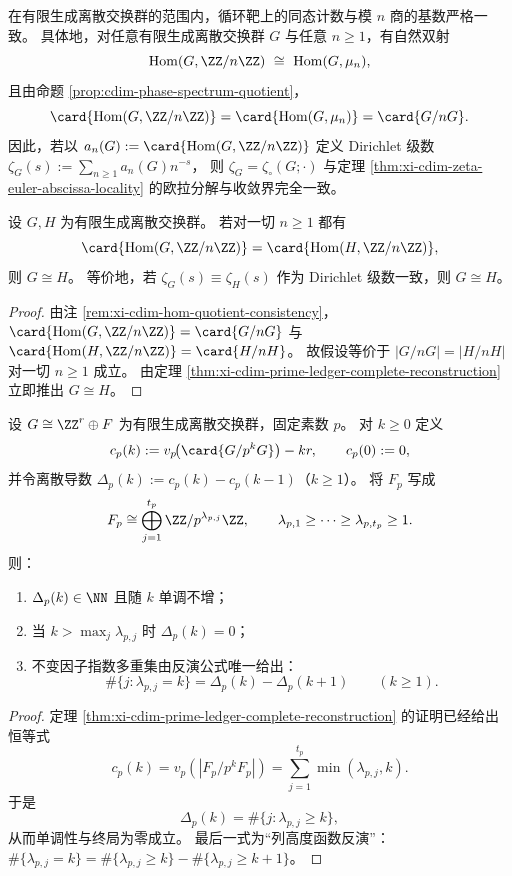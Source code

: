 \begin{remark}\label{rem:xi-cdim-hom-quotient-consistency}
在有限生成离散交换群的范围内，循环靶上的同态计数与模 \(n\) 商的基数严格一致。
具体地，对任意有限生成离散交换群 \(G\) 与任意 \(n\ge 1\)，有自然双射
\[
\operatorname{Hom}(G,\ZZ/n\ZZ)\ \cong\ \operatorname{Hom}(G,\mu_n),
\]
且由命题 \ref{prop:cdim-phase-spectrum-quotient}，
\[
\card{\operatorname{Hom}(G,\ZZ/n\ZZ)}=\card{\operatorname{Hom}(G,\mu_n)}=\card{G/nG}.
\]
因此，若以
\(
a_n(G):=\card{\operatorname{Hom}(G,\ZZ/n\ZZ)}
\)
定义 Dirichlet 级数
\(
\zeta_G(s):=\sum_{n\ge 1}a_n(G)n^{-s}
\)，
则 \(\zeta_G=\zeta_{\circ}(G;\cdot)\) 与定理 \ref{thm:xi-cdim-zeta-euler-abscissa-locality} 的欧拉分解与收敛界完全一致。
\end{remark}

\begin{corollary}\label{cor:xi-cdim-zeta-fingerprint-rigidity}
设 \(G,H\) 为有限生成离散交换群。
若对一切 \(n\ge 1\) 都有
\[
\card{\operatorname{Hom}(G,\ZZ/n\ZZ)}=\card{\operatorname{Hom}(H,\ZZ/n\ZZ)},
\]
则 \(G\cong H\)。
等价地，若 \(\zeta_G(s)\equiv \zeta_H(s)\) 作为 Dirichlet 级数一致，则 \(G\cong H\)。
\end{corollary}
\begin{proof}
由注 \ref{rem:xi-cdim-hom-quotient-consistency}，
\(
\card{\operatorname{Hom}(G,\ZZ/n\ZZ)}=\card{G/nG}
\)
与
\(
\card{\operatorname{Hom}(H,\ZZ/n\ZZ)}=\card{H/nH}
\)。
故假设等价于 \(|G/nG|=|H/nH|\) 对一切 \(n\ge 1\) 成立。
由定理 \ref{thm:xi-cdim-prime-ledger-complete-reconstruction} 立即推出 \(G\cong H\)。
\end{proof}

\begin{proposition}\label{prop:xi-cdim-local-inversion-delta}
设 \(G\cong \ZZ^{r}\oplus F\) 为有限生成离散交换群，固定素数 \(p\)。
对 \(k\ge 0\) 定义
\[
c_p(k):=v_p\!\bigl(\card{G/p^kG}\bigr)-kr,\qquad c_p(0):=0,
\]
并令离散导数 \(\Delta_p(k):=c_p(k)-c_p(k-1)\)（\(k\ge 1\)）。
将 \(F_p\) 写成
\[
F_p\cong \bigoplus_{j=1}^{t_p}\ZZ/p^{\lambda_{p,j}}\ZZ,\qquad
\lambda_{p,1}\ge\cdots\ge \lambda_{p,t_p}\ge 1.
\]
则：
\begin{enumerate}
  \item \(\Delta_p(k)\in\NN\) 且随 \(k\) 单调不增；
  \item 当 \(k>\max_j\lambda_{p,j}\) 时 \(\Delta_p(k)=0\)；
  \item 不变因子指数多重集由反演公式唯一给出：
  \[
  \#\{j:\lambda_{p,j}=k\}=\Delta_p(k)-\Delta_p(k+1)\qquad(k\ge 1).
  \]
\end{enumerate}
\end{proposition}
\begin{proof}
定理 \ref{thm:xi-cdim-prime-ledger-complete-reconstruction} 的证明已经给出恒等式
\[
c_p(k)=v_p(|F_p/p^kF_p|)=\sum_{j=1}^{t_p}\min(\lambda_{p,j},k).
\]
于是
\[
\Delta_p(k)=\#\{j:\lambda_{p,j}\ge k\},
\]
从而单调性与终局为零成立。
最后一式为“列高度函数反演”：\(\#\{\lambda_{p,j}=k\}=\#\{\lambda_{p,j}\ge k\}-\#\{\lambda_{p,j}\ge k+1\}\)。
\end{proof}


